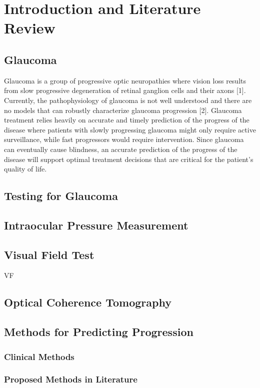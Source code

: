 \chapter{Introduction and Literature Review}

\section{Glaucoma}

Glaucoma is a group of progressive optic neuropathies where vision loss results from slow progressive degeneration of retinal ganglion cells and their axons \cite{Yamao2017} [1]. Currently, the pathophysiology of glaucoma is not well understood and there are no models that can robustly characterize glaucoma progression [2]. Glaucoma treatment relies heavily on accurate and timely prediction of the progress of the disease where patients with slowly progressing glaucoma might only require active surveillance, while fast progressors would require intervention. Since glaucoma can eventually cause blindness, an accurate prediction of the progress of the disease will support optimal treatment decisions that are critical for the patient’s quality of life.  

\section{Testing for Glaucoma}

\section{Intraocular Pressure Measurement}

\section{Visual Field Test}

\ac{VF}

\section{Optical Coherence Tomography}

\section{Methods for Predicting Progression}

\subsection{Clinical Methods}

\subsection{Proposed Methods in Literature}
